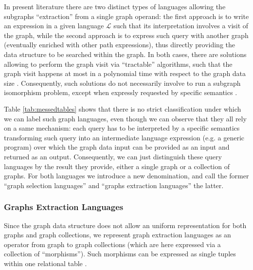 In present literature there are two distinct types of languages allowing the subgraphs ``extraction'' from a single graph operand:  the first approach is to write an expression in a given language $\mathcal{L}$ such that its interpretation involves a visit of the graph, while the second approach is to express such query with another graph (eventually enriched with other path expressions), thus directly providing the data structure to be searched within the graph. In both cases, there are solutions allowing to perform the graph visit via ``tractable'' algorithms, such that the graph visit happens at most in a polynomial time with respect to the graph data size \cite{n3,NautiLOD,Barcelo2013}. Consequently, such solutions do not necessarily involve to run a subgraph isomorphism  problem, except when expressly requested by specific semantics \cite{AnglesABHRV17,JunghannsKAPR17}.

Table \vref{tab:messedtables} shows that there is no strict classification under which we can label such graph languages, even though we can observe that they all rely on a same mechanism: each query has to be interpreted by a specific semantics transforming such query into an intermediate language expression (e.g. a generic program) over which the graph data input can be provided as an input and returned as an output. Consequently, we can just distinguish these query languages by the result they provide, either a single graph or a collection of graphs. For both languages we introduce a new denomination, and call the former ``graph selection languages'' and ``graphs extraction languages'' the latter. 

\subsubsection{Graphs Extraction Languages}\label{subsec:gpm}

Since the graph data structure does not allow an uniform representation for both graphs and graph collections, we  represent graph extraction languages as an operator from graph to graph collections (which are here expressed  via a collection of ``morphisms''). Such morphisms can be expressed as single tuples within one relational table \cite{AnglesABHRV17}.

